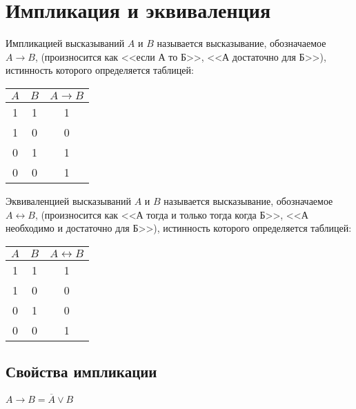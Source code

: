 \section{Импликация и эквиваленция}

\label{def:Импликация}
\begin{definition}[Импликация]
	Импликацией высказываний $A$ и $B$ называется высказывание, обозначаемое $A \rightarrow B$, (произносится как <<если А то Б>>, <<А достаточно для Б>>), истинность которого определяется таблицей:
	\begin{center}
		\begin{tabular}{ |c|c|c| } 
			\hline
			$A$ & $B$ & $A \rightarrow B$ \\
			\hline 
			1 & 1 & 1 \\ 
			1 & 0 & 0 \\
			0 & 1 & 1 \\ 
			0 & 0 & 1 \\  
			\hline
		\end{tabular}
	\end{center}
\end{definition}

\label{def:Эквиваленция}
\begin{definition}[Эквиваленция]
	Эквиваленцией высказываний $A$ и $B$ называется высказывание, обозначаемое $A \leftrightarrow B$, (произносится как <<А тогда и только тогда когда Б>>, <<А необходимо и достаточно для Б>>), истинность которого определяется таблицей:
	\begin{center}
		\begin{tabular}{ |c|c|c| } 
			\hline
			$A$ & $B$ & $A \leftrightarrow B$ \\
			\hline 
			1 & 1 & 1 \\ 
			1 & 0 & 0 \\
			0 & 1 & 0 \\ 
			0 & 0 & 1 \\  
			\hline
		\end{tabular}
	\end{center}
\end{definition}

\subsection{Свойства импликации}

\begin{theorem} \label{thm:1.3.1}
	$A \rightarrow B = \overline{A} \lor B$
\end{theorem}


